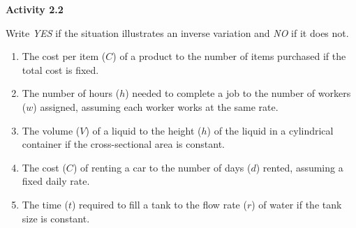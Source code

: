  \vspace{1ex}
\noindent\textbf{Activity 2.2}

\vspace{0.75ex}

Write \emph{YES} if the situation illustrates an inverse variation and \emph{NO} if it does not.

\begin{enumerate}[noitemsep, label = \color{blue}\arabic*. ]
   \item The cost per item ($C$) of a product to the number of items purchased if the total cost is fixed.
   \item The number of hours ($h$) needed to complete a job to the number of workers ($w$) assigned, assuming each worker works at the same rate.
   \item The volume ($V$) of a liquid to the height ($h$) of the liquid in a cylindrical container if the cross-sectional area is constant.
   \item The cost ($C$) of renting a car to the number of days ($d$) rented, assuming a fixed daily rate.
   \item The time ($t$) required to fill a tank to the flow rate ($r$) of water if the tank size is constant.
\end{enumerate}
